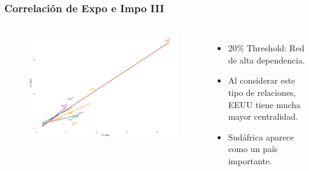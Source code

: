 \documentclass[professionalfont,fleqn]{beamer}
\begin{document}
		\begin{frame}
		
	\frametitle{Correlación de Expo e Impo III}
		\begin{columns}[c] %
		
	
	
	\begin{flushleft}
		\begin{figure}
			\includegraphics[width=\linewidth]{corr_grados_2011_20_pcnt}
		\end{figure}
	\end{flushleft}
	
	
	\begin{itemize}
		\item 20\% Threshold: Red de alta dependencia.
		\item Al considerar este tipo de relaciones, EEUU tiene mucha mayor centralidad.
		\item Sudáfrica aparece como un país importante.
	\end{itemize}
		\end{columns}
	\end{frame}
	
\end{document}
